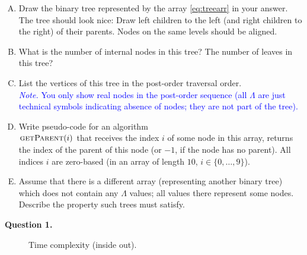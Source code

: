 \documentclass[a4paper,12pt]{article}
\begin{document}
\begin{enumerate}[(A)]
\item Draw the binary tree represented by the array \ref{eq:treearr} in your answer. 
The tree should look nice: 
Draw left children to the left (and right children to the right)
of their parents. Nodes on the same levels should be aligned. 
\item What is the number of internal nodes in this tree? The number of leaves in this tree?
\item List the vertices of this tree in the post-order traversal order.\\
\textcolor{blue}{\footnotesize
{\em Note.} You only show real nodes in the post-order sequence (all $\Lambda$ are 
just technical symbols indicating absence of nodes; they are not part of the tree). 
}
\item Write pseudo-code for an algorithm\\ 
$\text{\textsc{getParent}}(i)$ that receives 
the index $i$ of some node in this array, returns the index of the parent of this node (or $-1$, if the node has no parent). 
All indices $i$ are zero-based (in an array of length $10$, $i \in \{0,\ldots,9\}$).
\item Assume that there is a different array (representing another binary tree) which does not contain any $\Lambda$ 
values; all values there represent some nodes. Describe the property such trees must satisfy.  
\end{enumerate}



\newpage

{\bf Question 1.} 

\begin{figure}[!htb]
\caption{\label{fig:midterm-binary-tree} Time complexity (inside out).}
\end{figure}
\end{document}
